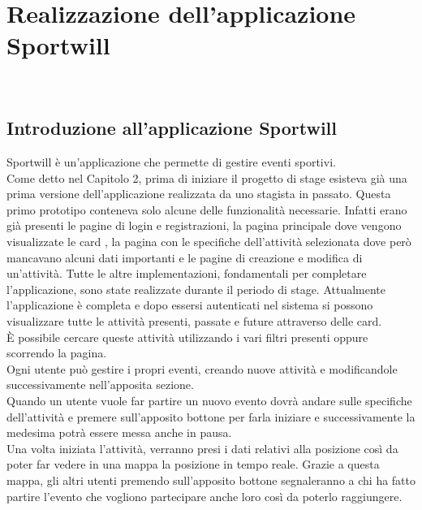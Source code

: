 
\chapter{Realizzazione dell'applicazione Sportwill}
\label{cap:Sportwill}

\\


\section{Introduzione all'applicazione Sportwill}
Sportwill è un'applicazione che permette di gestire eventi sportivi.\\
Come detto nel Capitolo 2, prima di iniziare il progetto di stage esisteva già una prima versione dell'applicazione realizzata da uno stagista in passato.
Questa primo prototipo conteneva solo alcune delle funzionalità necessarie.
Infatti erano già presenti le pagine di login e registrazioni, la pagina principale dove vengono visualizzate le card \cite{card}, la pagina con le specifiche dell'attività selezionata dove però mancavano alcuni dati importanti e le pagine di creazione e modifica di un'attività.
 Tutte le altre implementazioni, fondamentali per completare l'applicazione, sono state realizzate durante il periodo di stage.
Attualmente l'applicazione è completa e dopo essersi autenticati nel sistema si possono visualizzare tutte le attività presenti, passate e future attraverso delle card.\\
 È possibile cercare queste attività utilizzando i vari filtri presenti oppure scorrendo la pagina.\\ 
 Ogni utente può gestire i propri eventi, creando nuove attività e modificandole successivamente nell'apposita sezione.\\
 Quando un utente vuole far partire un nuovo evento dovrà andare sulle specifiche dell'attività e premere sull'apposito bottone per farla iniziare e successivamente la medesima potrà essere messa anche in pausa.\\
 Una volta iniziata l'attività, verranno presi i dati relativi alla posizione così da poter far vedere in una mappa la posizione in tempo reale.
 Grazie a questa mappa, gli altri utenti premendo sull'apposito bottone segnaleranno a chi ha fatto partire l'evento che vogliono partecipare anche loro così da poterlo raggiungere.
 
